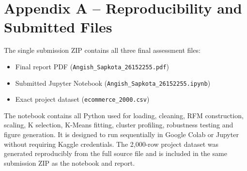 \documentclass[11pt,a4paper]{article}
\begin{document}
\clearpage
\section*{Appendix A -- Reproducibility and Submitted Files}
The single submission ZIP contains all three final assessment files:

\begin{itemize}[leftmargin=2em]
\item Final report PDF (\texttt{Angish\_Sapkota\_26152255.pdf})
\item Submitted Jupyter Notebook (\texttt{Angish\_Sapkota\_26152255.ipynb})
\item Exact project dataset (\texttt{ecommerce\_2000.csv})
\end{itemize}

The notebook contains all Python used for loading, cleaning, RFM construction, scaling, K selection, K-Means fitting, cluster profiling, robustness testing and figure generation. It is designed to run sequentially in Google Colab or Jupyter without requiring Kaggle credentials. The 2,000-row project dataset was generated reproducibly from the full source file and is included in the same submission ZIP as the notebook and report.
\end{document}
